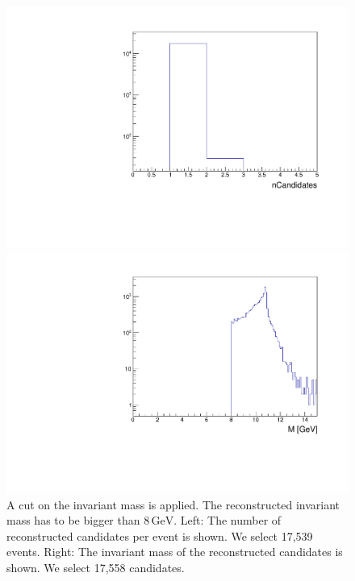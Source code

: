\documentclass[a4paper,11pt,twosided,final,german,openbib,pdftex,listof=totoc,bibliography=totoc]{scrbook}
\begin{document}
\begin{figure}[h!]
	\centering
	\begin{minipage}[b]{0.45\linewidth}
		\centering
		\includegraphics[width=\textwidth]{Cuts/nCandM.pdf}
	\end{minipage}
	\hspace{0.5cm}
	\begin{minipage}[b]{0.45\linewidth}
		\centering
		\includegraphics[width=\textwidth]{Cuts/MM.pdf}
	\end{minipage}
	\caption[Number Of Candidates And Invariant Mass ($\textrm{M} >8\,\textrm{GeV}$)]{A cut on the invariant mass is applied. The reconstructed invariant mass has to be bigger than $8\,\textrm{GeV}$. Left: The number of reconstructed candidates per event is shown. We select 17,539 events. Right: The invariant mass of the reconstructed candidates is shown. We select 17,558 candidates.}
	\label{fig:nCandM}
\end{figure}
\end{document}
